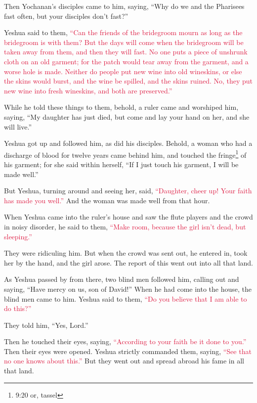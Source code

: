 \myverse{}Then Yochanan’s disciples came to him, saying, “Why do we and
the Pharisees fast often, but your disciples don’t fast?”

\myverse{}Yeshua said to them,
\textcolor{crimson}{“Can the friends of the bridegroom mourn as long as the bridegroom is with them? But the days will
	come when the bridegroom will be taken away from them, and then they will fast.
}
\myverse{}\textcolor{crimson}{No one puts a piece of unshrunk cloth on an old garment; for the patch
	would tear away from the garment, and a worse hole is made.
}
\myverse{}\textcolor{crimson}{Neither do people put new wine into old wineskins, or else the skins would
	burst, and the wine be spilled, and the skins ruined. No, they put new wine into fresh wineskins, and
	both are preserved.”}

\myverse{}While he told these things to them, behold, a ruler came and
worshiped him, saying, “My daughter has just died, but come and lay your hand on her, and she will live.”

\myverse{}Yeshua got up and followed him, as did his disciples.
\myverse{}Behold, a woman who had a discharge of blood for twelve years came behind
him, and touched the fringe\footnote{9:20 or, tassel} of his garment;
\myverse{}for she said within herself, “If I just touch his garment, I will be made
well.”

\myverse{}But Yeshua, turning around and seeing her, said,
\textcolor{crimson}{“Daughter, cheer up! Your faith has made you well.”} And the woman was made well from that hour.

\myverse{}When Yeshua came into the ruler’s house and saw the flute players
and the crowd in noisy disorder,
\myverse{}he said to them,
\textcolor{crimson}{“Make room, because the girl isn’t dead, but sleeping.”}

They were ridiculing him.
\myverse{}But when the crowd was sent out, he entered in, took her by the hand, and
the girl arose.
\myverse{}The report of this went out into all that land.

\myverse{}As Yeshua passed by from there, two blind men followed him, calling
out and saying, “Have mercy on us, son of David!”
\myverse{}When he had come into the house, the blind men came to him. Yeshua said to
them,
\textcolor{crimson}{“Do you believe that I am able to do this?”}

They told him, “Yes, Lord.”

\myverse{}Then he touched their eyes, saying,
\textcolor{crimson}{“According to your faith be it done to you.”}
\myverse{}Then their eyes were opened. Yeshua strictly commanded them, saying,
\textcolor{crimson}{“See that no one knows about this.”}
\myverse{}But they went out and spread abroad his fame in all that land.


